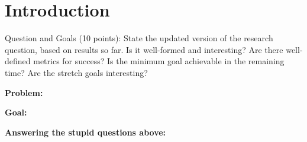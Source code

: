 \section{Introduction}
\label{sec:intro}

Question and Goals (10 points): State the updated version of the research question, based on results so far. Is it well-formed and interesting? Are there well-defined metrics for success? Is the minimum goal achievable in the remaining time? Are the stretch goals interesting?

{\bf Problem:}

{\bf Goal:}

{\bf Answering the stupid questions above:}


